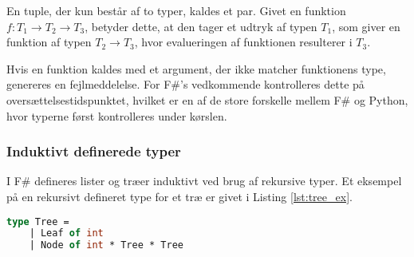 


En tuple, der kun består af to typer, kaldes et par. Givet en funktion $f: T_1 \rightarrow T_2 \rightarrow T_3$, betyder dette, at den tager et udtryk af typen $T_1$, som giver en funktion af typen $T_2 \rightarrow T_3$, hvor evalueringen af funktionen resulterer i $T_3$.

Hvis en funktion kaldes med et argument, der ikke matcher funktionens type, genereres en fejlmeddelelse. For F\#'s vedkommende kontrolleres dette på oversættelsestidspunktet, hvilket er en af de store forskelle mellem F\# og Python, hvor typerne først kontrolleres under kørslen.

\subsubsection{Induktivt definerede typer}
I F\# defineres lister og træer induktivt ved brug af rekursive typer. Et eksempel på en rekursivt defineret type for et træ er givet i Listing \ref{lst:tree_ex}.

\begin{lstlisting}[language={FSharp}, label={lst:tree_ex}, caption={Eksempel på en rekursivt defineret type for et binært træ i F\#}]
type Tree = 
    | Leaf of int
    | Node of int * Tree * Tree
\end{lstlisting}

